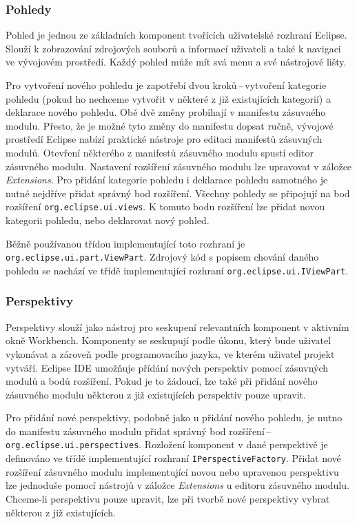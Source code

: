       \subsubsection{Pohledy}
      Pohled je jednou ze základních komponent tvořících uživatelské rozhraní Eclipse. Slouží k zobrazování zdrojových souborů a informací uživateli a také k navigaci ve vývojovém prostředí. Každý pohled může mít svá menu a své nástrojové lišty.
      
      Pro vytvoření nového pohledu je zapotřebí dvou kroků\,--\,vytvoření kategorie pohledu (pokud ho nechceme vytvořit v některé z již existujících kategorií) a deklarace nového pohledu. Obě dvě změny probíhají v manifestu zásuvného modulu. Přesto, že je možné tyto změny do manifestu dopsat ručně, vývojové prostředí Eclipse nabízí praktické nástroje pro editaci manifestů zásuvných modulů. Otevření některého z manifestů zásuvného modulu spustí editor zásuvného modulu. Nastavení rozšíření zásuvného modulu lze upravovat v záložce \emph{Extensions}. Pro přidání kategorie pohledu i deklarace pohledu samotného je nutné nejdříve přidat správný bod rozšíření. Všechny pohledy se připojují na bod rozšíření \texttt{org.eclipse.ui.views}. K tomuto bodu rozšíření lze přidat novou kategorii pohledu, nebo deklarovat nový pohled.

      Běžně používanou třídou implementující toto rozhraní je \texttt{org.eclipse.ui.part.ViewPart}. Zdrojový kód s popisem chování daného pohledu se nachází ve třídě implementující rozhraní \texttt{org.eclipse.ui.IViewPart}.

      \subsubsection{Perspektivy}
      Perspektivy slouží jako nástroj pro seskupení relevantních komponent v aktivním okně Workbench. Komponenty se seskupují podle úkonu, který bude uživatel vykonávat a  zároveň podle programovacího jazyka, ve kterém uživatel projekt vytváří. Eclipse IDE umožňuje přídání nových perspektiv pomocí zásuvných modulů a bodů rozšíření. Pokud je to žádoucí, lze také při přidání nového zásuvného modulu některou z již existujících perspektiv pouze upravit.

      Pro přidání nové perspektivy, podobně jako u přidání nového pohledu, je nutno do manifestu zásuvného modulu přidat správný bod rozšíření\,--\,\texttt{org.eclipse.ui.perspectives}. Rozložení komponent v dané perspektivě je definováno ve třídě implementující rozhraní \texttt{IPerspectiveFactory}. Přidat nové rozšíření zásuvného modulu implementující novou nebo upravenou perspektivu lze jednoduše pomocí nástrojů v záložce \emph{Extensions} u editoru zásuvného modulu. Chceme-li perspektivu pouze upravit, lze při tvorbě nové perspektivy vybrat některou z již existujících.

